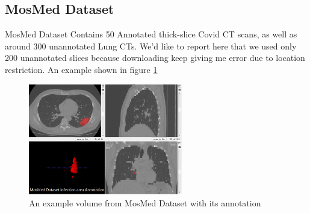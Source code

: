 \subsection{MosMed Dataset}
MosMed Dataset Contains 50 Annotated thick-slice Covid CT scans, as well as around 300 unannotated Lung CTs. We'd like to report here that we used only 200 unannotated slices because downloading keep giving me error due to location restriction. An example shown in figure \ref{fig:MosMed_example}
\begin{figure}[h]
	\centering
	\includegraphics[width=0.6\textwidth]{img/Dataset/MosMed_example}
	\caption{An example volume from MosMed Dataset with its annotation}
	\label{fig:MosMed_example}
\end{figure}



